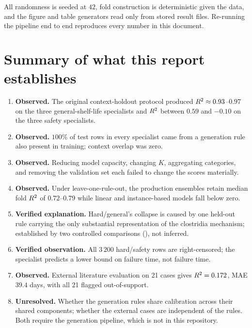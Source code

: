 All randomness is seeded at $42$, fold construction is deterministic given
the data, and the figure and table generators read only from stored result
files. Re-running the pipeline end to end reproduces every number in this
document.

\section{Summary of what this report establishes}

\begin{enumerate}[leftmargin=1.5em, itemsep=3pt]
\item \textbf{Observed.} The original context-holdout protocol produced
  $R^2 \approx 0.93$--$0.97$ on the three general-shelf-life specialists
  and $R^2$ between $0.59$ and $-0.10$ on the three safety specialists.
\item \textbf{Observed.} $100\%$ of test rows in every specialist came
  from a generation rule also present in training; context overlap was
  zero.
\item \textbf{Observed.} Reducing model capacity, changing $K$,
  aggregating categories, and removing the validation set each failed to
  change the scores materially.
\item \textbf{Observed.} Under leave-one-rule-out, the production
  ensembles retain median fold $R^2$ of $0.72$--$0.79$ while linear and
  instance-based models fall below zero.
\item \textbf{Verified explanation.} Hard/general's collapse is caused by
  one held-out rule carrying the only substantial representation of the
  clostridia mechanism; established by two controlled comparisons
  (), not inferred.
\item \textbf{Verified observation.} All $3\,200$ hard/safety rows are
  right-censored; the specialist predicts a lower bound on failure time,
  not failure time.
\item \textbf{Observed.} External literature evaluation on 21 cases gives
  $R^2 = 0.172$, MAE $39.4$ days, with all 21 flagged out-of-support.
\item \textbf{Unresolved.} Whether the generation rules share calibration
  across their shared components; whether the external cases are
  independent of the rules. Both require the generation pipeline, which is
  not in this repository.
\end{enumerate}
